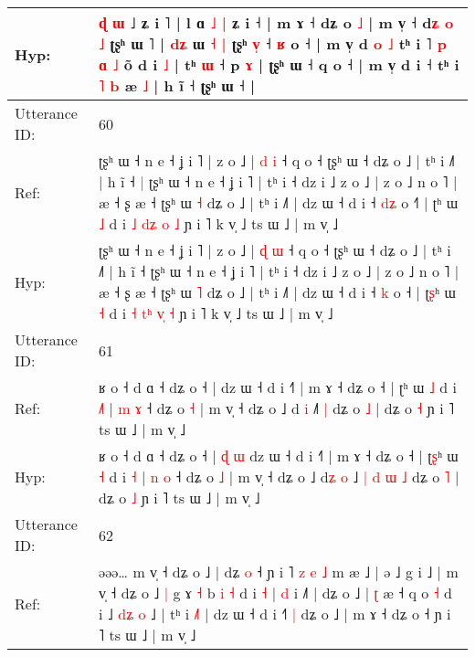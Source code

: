\documentclass[10pt]{article}
\DeclareRobustCommand{\hl}[1]{{\textcolor{red}{#1}}}
\begin{document}
\begin{longtable}{ll}
 \\
Hyp: & \hl{ɖ} \hl{ɯ} ˩ ʑ i ˥ | l ɑ\hl{ }\hl{˩} \hl{|} ʑ i ˧\hl{} | m ɤ ˧ dʑ o \hl{˩} | m v̩ ˧ d\hl{ʑ} \hl{o} \hl{˩} ʈʂʰ ɯ ˥ | \hl{d}\hl{ʑ} ɯ\hl{ }\hl{˧}\hl{ }\hl{|} ʈʂʰ \hl{v}\hl{̩} ˧ \hl{ʁ} o ˧ | m v̩\hl{}\hl{} d\hl{}\hl{} \hl{}\hl{o} \hl{˩} tʰ i\hl{}\hl{}\hl{}\hl{}\hl{}\hl{} \hl{}˥\hl{}\hl{}\hl{}\hl{}\hl{}\hl{} \hl{p} \hl{ɑ} \hl{˩} o\hl{}\hl{}\hl{}\hl{}\hl{}\hl{}\hl{}\hl{}\hl{}\hl{}\hl{̃} d i \hl{}\hl{˩} | tʰ \hl{ɯ} ˧ p\hl{}\hl{} \hl{}\hl{ɤ} | ʈʂʰ ɯ ˧ q o ˧ | m v̩\hl{}\hl{} d i ˧\hl{}\hl{}\hl{} tʰ i \hl{˥} \hl{b} æ \hl{}\hl{˩} | h ĩ ˧ ʈʂʰ ɯ ˧ |
 \\
\midrule
Utterance ID: & 60 \\
Ref: & ʈʂʰ ɯ ˧ n e ˧ ʝ i ˥ | z o ˩ | \hl{d} \hl{i} ˧ q o ˧ ʈʂʰ ɯ ˧ dʑ o ˩ | tʰ i ˩˥ | h ĩ ˧\hl{ }\hl{|} ʈʂʰ ɯ ˧ n e ˧ ʝ i ˥ | tʰ i ˧ dz i ˩ z o ˩ | z o ˩ n o ˥ | æ ˧ ʂ æ ˧ ʈʂʰ ɯ \hl{˧} dʑ o ˩ | tʰ i ˩˥ | dz ɯ ˧ d i ˧ \hl{d}\hl{ʑ} o ˧\hl{˥} | ʈ\hl{}ʰ ɯ \hl{˩} d i \hl{˩} \hl{d}\hl{ʑ} \hl{}\hl{o} \hl{˩} ɲ i ˥ k v̩ ˩ ts ɯ ˩ | m v̩ ˩
 \\
Hyp: & ʈʂʰ ɯ ˧ n e ˧ ʝ i ˥ | z o ˩ | \hl{ɖ} \hl{ɯ} ˧ q o ˧ ʈʂʰ ɯ ˧ dʑ o ˩ | tʰ i ˩˥ | h ĩ ˧\hl{}\hl{} ʈʂʰ ɯ ˧ n e ˧ ʝ i ˥ | tʰ i ˧ dz i ˩ z o ˩ | z o ˩ n o ˥ | æ ˧ ʂ æ ˧ ʈʂʰ ɯ \hl{˥} dʑ o ˩ | tʰ i ˩˥ | dz ɯ ˧ d i ˧ \hl{}\hl{k} o ˧\hl{} | ʈ\hl{ʂ}ʰ ɯ \hl{˧} d i \hl{˧} \hl{t}\hl{ʰ} \hl{v}\hl{̩} \hl{˧} ɲ i ˥ k v̩ ˩ ts ɯ ˩ | m v̩ ˩
 \\
\midrule
Utterance ID: & 61 \\
Ref: & ʁ o ˧ d ɑ ˧ dʑ o ˧ |\hl{}\hl{}\hl{}\hl{} dz ɯ ˧ d i ˧˥ | m ɤ ˧ dʑ o ˧ | ʈ\hl{}ʰ ɯ \hl{˩} d i \hl{˩}\hl{˥} | \hl{m} \hl{ɤ} ˧ dʑ o \hl{˧} | m v̩ ˧ dʑ o ˩ d\hl{} \hl{i} ˩\hl{}\hl{}\hl{}\hl{}\hl{}\hl{˥} \hl{|} dʑ o \hl{˩} | dʑ o \hl{˧} ɲ i ˥ ts ɯ ˩ | m v̩ ˩
 \\
Hyp: & ʁ o ˧ d ɑ ˧ dʑ o ˧ |\hl{ }\hl{ɖ}\hl{ }\hl{ɯ} dz ɯ ˧ d i ˧˥ | m ɤ ˧ dʑ o ˧ | ʈ\hl{ʂ}ʰ ɯ \hl{˧} d i \hl{}\hl{˧} | \hl{n} \hl{o} ˧ dʑ o \hl{˩} | m v̩ ˧ dʑ o ˩ d\hl{ʑ} \hl{o} ˩\hl{ }\hl{|}\hl{ }\hl{d}\hl{ }\hl{ɯ} \hl{˩} dʑ o \hl{˥} | dʑ o \hl{˩} ɲ i ˥ ts ɯ ˩ | m v̩ ˩
 \\
\midrule
Utterance ID: & 62 \\
Ref: & əəə… m v̩ ˧ dʑ o ˩ | dʑ \hl{}\hl{o} ˧ ɲ i ˥\hl{ }\hl{z}\hl{ }\hl{e}\hl{ }\hl{˩} m æ ˩ | ə ˩ g i ˩ | m v̩ ˧ dʑ o ˩\hl{ }\hl{|} g ɤ \hl{˧} b \hl{i} \hl{˧} d i \hl{˧} | \hl{d} i ˩˥ | dʑ o ˩ | \hl{ʈ} æ ˧ q o \hl{˧} d i ˩ \hl{d}\hl{ʑ}\hl{ }\hl{o} ˩ | tʰ i\hl{ }\hl{˩}\hl{˥} | dz ɯ ˧ d i ˧\hl{˥}\hl{ }\hl{|} dʑ o ˩ | m ɤ ˧ dʑ o ˧ ɲ i ˥ ts ɯ ˩ | m v̩ ˩
 \\

\end{longtable}
\end{document}
